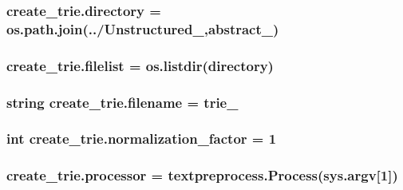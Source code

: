 \subsubsection[{\texorpdfstring{directory}{directory}}]{\setlength{\rightskip}{0pt plus 5cm}create\+\_\+trie.\+directory = os.\+path.\+join(\textquotesingle{}../Unstructured\+\_\+\textquotesingle{},\textquotesingle{}abstract\+\_\+\textquotesingle{})}\hypertarget{namespacecreate__trie_ad979a10ba749c867088265cbcb65e168}{}\label{namespacecreate__trie_ad979a10ba749c867088265cbcb65e168}
\subsubsection[{\texorpdfstring{filelist}{filelist}}]{\setlength{\rightskip}{0pt plus 5cm}create\+\_\+trie.\+filelist = os.\+listdir({\bf directory})}\hypertarget{namespacecreate__trie_ad27168f07283984f7da7afcb2cb9c7fa}{}\label{namespacecreate__trie_ad27168f07283984f7da7afcb2cb9c7fa}
\subsubsection[{\texorpdfstring{filename}{filename}}]{\setlength{\rightskip}{0pt plus 5cm}string create\+\_\+trie.\+filename = \textquotesingle{}trie\+\_\+\textquotesingle{}}\hypertarget{namespacecreate__trie_a430ef8eaeeaf47147c83447c0a4126bc}{}\label{namespacecreate__trie_a430ef8eaeeaf47147c83447c0a4126bc}
\subsubsection[{\texorpdfstring{normalization\+\_\+factor}{normalization_factor}}]{\setlength{\rightskip}{0pt plus 5cm}int create\+\_\+trie.\+normalization\+\_\+factor = 1}\hypertarget{namespacecreate__trie_a17ca012774362c641290dcc4ed707618}{}\label{namespacecreate__trie_a17ca012774362c641290dcc4ed707618}
\subsubsection[{\texorpdfstring{processor}{processor}}]{\setlength{\rightskip}{0pt plus 5cm}create\+\_\+trie.\+processor = {\bf textpreprocess.\+Process}(sys.\+argv\mbox{[}1\mbox{]})}\hypertarget{namespacecreate__trie_a9338168a517e921ea77908dc05081b08}{}\label{namespacecreate__trie_a9338168a517e921ea77908dc05081b08}
